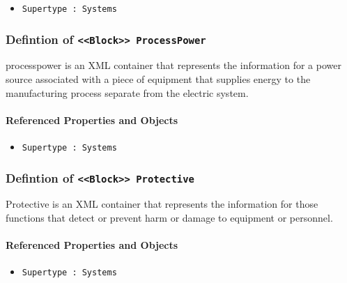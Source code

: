 \begin{itemize}
\item \texttt{Supertype : Systems}

\end{itemize}
\FloatBarrier
\subsubsection{Defintion of \texttt{<<Block>> ProcessPower}}
  \label{type:ProcessPower}

\FloatBarrier

processpower is an XML container that represents the information for a power source associated with a piece of equipment that supplies energy to the manufacturing process separate from the electric system.

\FloatBarrier
\paragraph{Referenced Properties and Objects}

\begin{itemize}
\item \texttt{Supertype : Systems}

\end{itemize}
\FloatBarrier
\subsubsection{Defintion of \texttt{<<Block>> Protective}}
  \label{type:Protective}

\FloatBarrier

Protective is an XML container that represents the information for those functions that detect or prevent harm or damage to equipment or personnel.

\FloatBarrier
\paragraph{Referenced Properties and Objects}

\begin{itemize}
\item \texttt{Supertype : Systems}

\end{itemize}
\FloatBarrier
